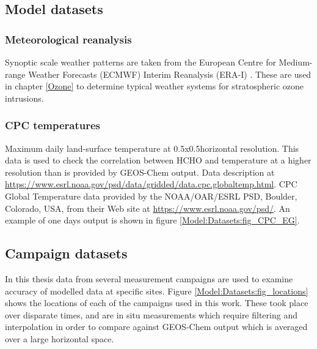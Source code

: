  \subsection{Model datasets}
    \subsubsection{Meteorological reanalysis}
      \label{Model:Datasets:ERAI}
      
      Synoptic scale weather patterns are taken from the European Centre for Medium-range Weather Forecasts (ECMWF) Interim Reanalysis (ERA-I) \parencite{Dee2011}.
      These are used in chapter \ref{Ozone} to determine typical weather systems for stratospheric ozone intrusions.
    
    \subsubsection{CPC temperatures}
      Maximum daily land-surface temperature at 0.5x0.5\degr horizontal resolution. 
      This data is used to check the correlation between HCHO and temperature at a higher resolution than is provided by GEOS-Chem output.
      Data description at \url{https://www.esrl.noaa.gov/psd/data/gridded/data.cpc.globaltemp.html}.
      CPC Global Temperature data provided by the NOAA/OAR/ESRL PSD, Boulder, Colorado, USA, from their Web site at \url{https://www.esrl.noaa.gov/psd/}.
      An example of one days output is shown in figure \ref{Model:Datasets:fig_CPC_EG}.
      
    
  \subsection{Campaign datasets}
    
    In this thesis data from several measurement campaigns are used to examine accuracy of modelled data at specific sites.
    Figure \ref{Model:Datasets:fig_locations} shows the locations of each of the campaigns used in this work.
    These took place over disparate times, and are in situ measurements which require filtering and interpolation in order to compare against GEOS-Chem output which is averaged over a large horizontal space.
    
    

